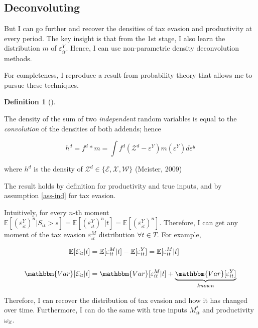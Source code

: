 \documentclass[
  12pt]{article}
\theoremstyle{definition}
\newtheorem{definition}{Definition}[section]
\theoremstyle{remark}
\begin{document}
\hypertarget{deconvoluting}{%
\subsection{Deconvoluting}\label{deconvoluting}}

But I can go further and recover the densities of tax evasion and
productivity at every period. The key insight is that from the 1st
stage, I also learn the distribution \(m\) of \(\varepsilon^Y_{it}\).
Hence, I can use non-parametric density deconvolution methods.

For completeness, I reproduce a result from probability theory that
allows me to pursue these techniques.

\leavevmode{}%
\begin{definition}[]\label{def-deconv}

The density of the sum of two \emph{independent} random variables is
equal to the \emph{convolution} of the densities of both addends; hence

\[h^d = f^d*m = \int f^d(\mathcal Z^d - \varepsilon^Y)m(\varepsilon^Y)d\varepsilon^y\]

where \(h^d\) is the density of \(\mathcal Z^d\in \{\mathcal{E,X,W}\}\)
(Meister, 2009)

\end{definition}

The result holds by definition for productivity and true inputs, and by
assumption \ref{ass-ind} for tax evasion.

Intuitively, for every \(n\)-th moment
\(\mathbb{E}[(\varepsilon^{Y}_{it})^n|S_{it}>s]=\mathbb{E}[(\varepsilon^{Y}_{it})^n|t]=\mathbb{E}[(\varepsilon^{Y}_{it})^n]\).
Therefore, I can get any moment of the tax evasion
\(\varepsilon^M_{it}\) distribution \(\forall t\in T\). For example,

\[
\begin{aligned}
  \mathbb{E}[\mathcal E_{it}|t]&=\mathbb{E}[\varepsilon^M_{it}|t]-\mathbb{E}[\varepsilon^Y_{it}]=\mathbb{E}[\varepsilon^M_{it}|t] \\
  \\
  \mathbbm{Var}[\mathcal E_{it}|t]&=\mathbbm{Var}[\varepsilon^M_{it}|t]
  +\underbrace{\mathbbm{Var}[\varepsilon^Y_{it}]}_{known}\\
\end{aligned}
\]

Therefore, I can recover the distribution of tax evasion and how it has
changed over time. Furthermore, I can do the same with true inputs
\(M_{it}^*\) and productivity \(\omega_{it}\).
\end{document}
